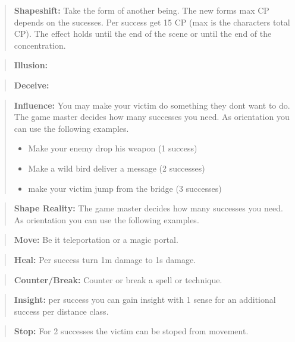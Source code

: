 \documentclass[11pt]{article}
\begin{document}
{\begin{multicols}{2}[]
\begin{quote}
\textbf{Shapeshift:} Take the form of another being. The new forms max CP depends on the sucesses. Per success get 15 CP (max is the characters total CP). The effect holds until the end of the scene or until the end of the concentration.
\end{quote}

\begin{quote}
\textbf{Illusion:}
\end{quote}

\begin{quote}
\textbf{Deceive:} 
\end{quote}

\begin{quote}
\textbf{Influence:} You may make your victim do something they dont want to do. The game master decides how many successes you need. As orientation you can use the following examples.
\begin{itemize}
\item Make your enemy drop his weapon (1 success)
\item Make a wild bird deliver a message (2 successes)
\item make your victim jump from the bridge (3 successes)
\end{itemize}
\end{quote}

\begin{quote}
\textbf{Shape Reality:}  The game master decides how many successes you need. As orientation you can use the following examples.
\end{quote}

\begin{quote}
\textbf{Move:} Be it teleportation or a magic portal. 
\end{quote}

\begin{quote}
\textbf{Heal:} Per success turn 1m damage to 1s damage.
\end{quote}

\begin{quote}
\textbf{Counter/Break:} Counter or break a spell or technique.
\end{quote}

\begin{quote}
\textbf{Insight:} per success you can gain insight with 1 sense for an additional success per distance class.
\end{quote}

\begin{quote}
\textbf{Stop:} For 2 successes the victim can be stoped from movement.
\end{quote}


\end{multicols}}
\end{document}
